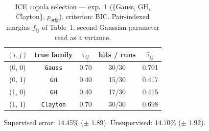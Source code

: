 \begin{table}[htbp]
  \centering
  \caption{ICE copula selection — exp.\ 1 (\{Gauss, GH, Clayton\}, $p_{\text{orig}}$), criterion: BIC. Pair-indexed margins $f_{ij}$ of Table~1, second Gaussian parameter read as a variance.}
  \label{tab:exp3-exp1_orig_p__bic}
  \begin{tabular}{ccccc}
    \toprule
    $(i, j)$ & true family & $\tau_{ij}$ & hits / runs & $\hat\tau_{ij}$ \\
    \midrule
    (0, 0) & \texttt{Gauss} & 0.70 & 30/30 & 0.701 \\
    (0, 1) & \texttt{GH} & 0.40 & 15/30 & 0.417 \\
    (1, 0) & \texttt{GH} & 0.40 & 17/30 & 0.415 \\
    (1, 1) & \texttt{Clayton} & 0.70 & 30/30 & 0.698 \\
    \bottomrule
  \end{tabular}
  \par\smallskip Supervised error: 14.45\% ($\pm$ 1.89). Unsupervised: 14.70\% ($\pm$ 1.92).
\end{table}
